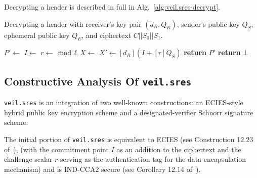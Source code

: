 Decrypting a header is described in full in Alg.~\ref{alg:veil.sres-decrypt}.

\begin{algorithm}[!htp]
    \caption{
        Decrypting a header with receiver's key pair $(d_R, Q_R)$, sender's public key $Q_S$, ephemeral public key
        $Q_E$, and ciphertext $C||S_0||S_1$.
    }
    \begin{algorithmic}[1]
            \State {} 
            \State {}\label{alg:veil.sres-decrypt-bind-sender}
            \State {}
            \State {}
            \State
            \State {}
            \State $P' \gets$ 
            \State
            \State $I \gets$ 
            \State $r \gets$  $\bmod~\ell$
            \State
            \State $X \gets$ 
            \State $X' \gets [d_R](I + [r]Q_S)$
            \State
                \State \textbf{return} $P'$
            \Else
                \State \textbf{return} $\bot$
            \EndIf
        \EndFunction
    \end{algorithmic}
    \label{alg:veil.sres-decrypt}
\end{algorithm}

\subsection{Constructive Analysis Of \texttt{veil.sres}}\label{subsec:veil.sres-analysis}

\texttt{veil.sres} is an integration of two well-known constructions: an ECIES-style hybrid public key encryption scheme
and a designated-verifier Schnorr signature scheme.

The initial portion of \texttt{veil.sres} is equivalent to ECIES (see Construction 12.23 of~\cite[p. 435]{katz2020}),
(with the commitment point $I$ as an addition to the ciphertext and the challenge scalar $r$ serving as the
authentication tag for the data encapsulation mechanism) and is IND-CCA2 secure (see Corollary 12.14
of~\cite[p. 436]{katz2020}).

